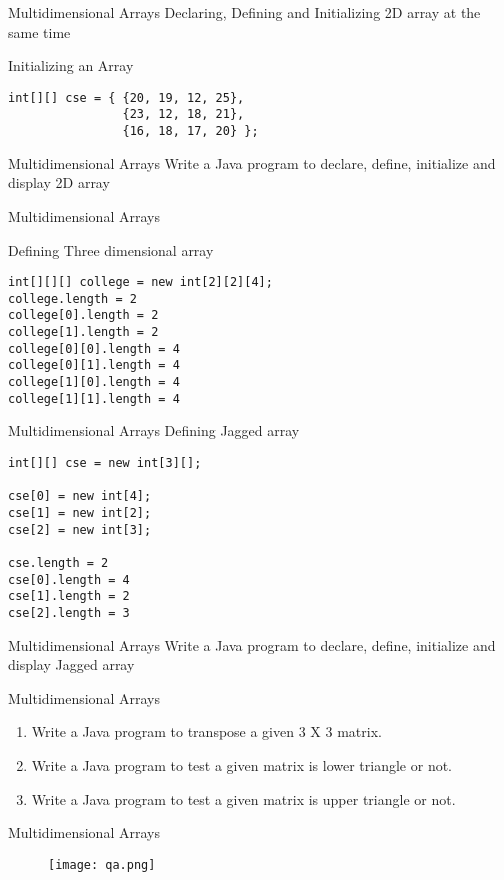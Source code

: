 \documentclass[14pt]{beamer}
\begin{document}
\begin{frame}[fragile]{Multidimensional Arrays}
Declaring, Defining and Initializing 2D array at the same time
\begin{block}{Initializing an Array}
\begin{lstlisting}[numbers=none]
int[][] cse = { {20, 19, 12, 25},
                {23, 12, 18, 21},
                {16, 18, 17, 20} };
\end{lstlisting}
\end{block}
\end{frame}

\begin{frame}{Multidimensional Arrays}
Write a Java program to declare, define, initialize and display 2D array
\end{frame}

\begin{frame}[fragile]{Multidimensional Arrays}
\begin{block}{Defining  Three dimensional array}
\begin{lstlisting}[numbers=none]
int[][][] college = new int[2][2][4];
college.length = 2
college[0].length = 2
college[1].length = 2
college[0][0].length = 4
college[0][1].length = 4
college[1][0].length = 4
college[1][1].length = 4
\end{lstlisting}
\end{block}
\end{frame}

\begin{frame}[fragile]{Multidimensional Arrays}
Defining  Jagged array
\begin{lstlisting}[numbers=none]
int[][] cse = new int[3][];

cse[0] = new int[4];
cse[1] = new int[2];
cse[2] = new int[3];

cse.length = 2
cse[0].length = 4
cse[1].length = 2
cse[2].length = 3
\end{lstlisting}
\end{frame}

\begin{frame}{Multidimensional Arrays}
Write a Java program to declare, define, initialize and display Jagged array
\end{frame}

\begin{frame}{Multidimensional Arrays}
\begin{enumerate}
\item Write a Java program to transpose a given 3 X 3 matrix.

\item Write a Java program to test a given matrix is lower triangle or not.

\item Write a Java program to test a given matrix is upper triangle or not.

\end{enumerate}
\end{frame}

\begin{frame}{Multidimensional Arrays}
\begin{figure}[H]
 \begin{center}
   \texttt{[image: qa.png]}   
 \end{center}
  \end{figure}
\end{frame}
\end{document}
